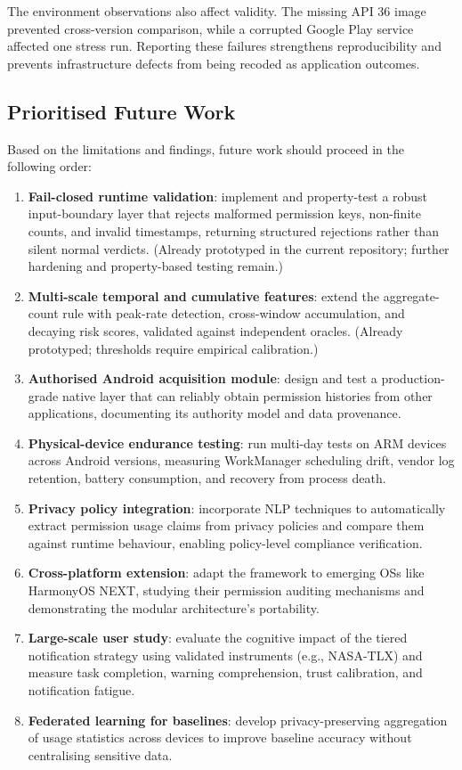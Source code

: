 The environment observations also affect validity. The missing API 36 image prevented cross-version comparison, while a corrupted Google Play service affected one stress run. Reporting these failures strengthens reproducibility and prevents infrastructure defects from being recoded as application outcomes.

\subsection{Prioritised Future Work}

Based on the limitations and findings, future work should proceed in the following order:

\begin{enumerate}
    \item \textbf{Fail-closed runtime validation}: implement and property-test a robust input-boundary layer that rejects malformed permission keys, non-finite counts, and invalid timestamps, returning structured rejections rather than silent normal verdicts. (Already prototyped in the current repository; further hardening and property-based testing remain.)
    \item \textbf{Multi-scale temporal and cumulative features}: extend the aggregate-count rule with peak-rate detection, cross-window accumulation, and decaying risk scores, validated against independent oracles. (Already prototyped; thresholds require empirical calibration.)
    \item \textbf{Authorised Android acquisition module}: design and test a production-grade native layer that can reliably obtain permission histories from other applications, documenting its authority model and data provenance.
    \item \textbf{Physical-device endurance testing}: run multi-day tests on ARM devices across Android versions, measuring WorkManager scheduling drift, vendor log retention, battery consumption, and recovery from process death.
    \item \textbf{Privacy policy integration}: incorporate NLP techniques to automatically extract permission usage claims from privacy policies and compare them against runtime behaviour, enabling policy-level compliance verification.
    \item \textbf{Cross-platform extension}: adapt the framework to emerging OSs like HarmonyOS NEXT, studying their permission auditing mechanisms and demonstrating the modular architecture's portability.
    \item \textbf{Large-scale user study}: evaluate the cognitive impact of the tiered notification strategy using validated instruments (e.g., NASA-TLX) and measure task completion, warning comprehension, trust calibration, and notification fatigue.
    \item \textbf{Federated learning for baselines}: develop privacy-preserving aggregation of usage statistics across devices to improve baseline accuracy without centralising sensitive data.
\end{enumerate}

